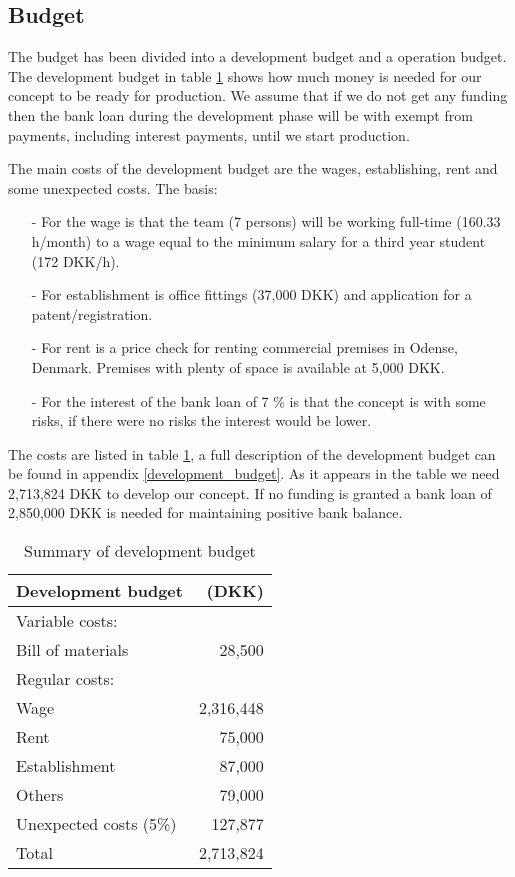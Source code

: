 \subsection{Budget}
\label{budget_label}
The budget has been divided into a development budget and a operation budget. 
The development budget in table \ref{devbud} shows how much money is needed for our concept to be ready for production. 
We assume that if we do not get any funding then the bank loan during the development phase will be with exempt from payments, including interest payments, until we start production. 

The main costs of the development budget are the wages, establishing, rent and some unexpected costs. 
The basis: \begin{itemize}
\item[-] For the wage is that the team (7 persons) will be working full-time (160.33 h/month) to a wage equal to the minimum salary for a third year student (172 DKK/h\cite{ida-salary}).
\item[-] For establishment is office fittings (37,000 DKK) and application for a patent/registration.
\item[-] For rent is a price check for renting commercial premises in Odense, Denmark. Premises with plenty of space is available at 5,000 DKK.\cite{rent_prices}
\item[-] For the interest of the bank loan of 7 \% is that the concept is with some risks, if there were no risks the interest would be lower. 
\end{itemize} 
The costs are listed in table \ref{devbud}, a full description of the development budget can be found in appendix \ref{development_budget}. 
As it appears in the table we need 2,713,824 DKK to develop our concept. 
If no funding is granted a bank loan of 2,850,000 DKK is needed for maintaining positive bank balance.

\begin{table}[h!]
\centering
\begin{tabular}{l r}
Development budget      & (DKK)              \\
\hline                                       
Variable costs:         &                    \\
Bill of materials       &    28,500        \\
Regular costs:          &                           \\
Wage                    &    2,316,448           \\
Rent                    &    75,000          \\
Establishment           &    87,000          \\
Others                  &    79,000          \\
Unexpected costs (5\%)  &    127,877         \\
\hline                      
Total                   &    2,713,824           \\
\end{tabular}
\caption{Summary of development budget}
\label{devbud}
\end{table}


